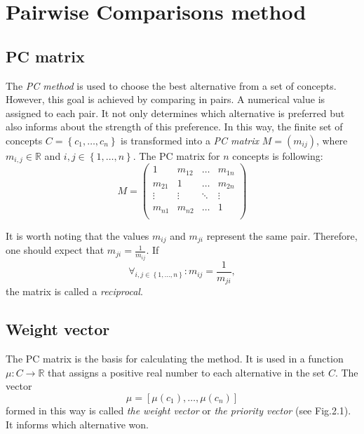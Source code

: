 \chapter{Pairwise Comparisons method}
\label{sec:pcMethod}
  \section{PC matrix}
	\label{subsec:macierzPC}
	
	The \textit{PC method} is used to choose the best alternative from a set of concepts. However, this goal is achieved by comparing in pairs. A numerical value is assigned to each pair. It not only determines which alternative is preferred but also informs about the strength of this preference. In this way, the finite set of concepts $C=\left\{ c_{1},\ldots,c_{n}\right\} $ is transformed into a \textit{PC matrix} $M=\left(m_{ij}\right)$, where $m_{i,j}\in \mathbb{R}$ and $i,j\in\left\{ 1,\ldots,n\right\}$. The PC matrix for $n$ concepts is following:
$$
M = 
\left(
\begin{array}{lllll}
	1 & m_{12} & \dots & m_{1n}\\
	m_{21} & 1 & \dots & m_{2n}\\
	\vdots & \vdots & \ddots & \vdots\\
	m_{n1} & m_{n2} & \dots & 1\\ 	
\end{array}
\right)
$$

	It is worth noting that the values $m_{ij}$ and $m_{ji}$ represent the same pair. Therefore, one should expect that $m_{ji}=\frac{1}{m_{ij}}$. If
	\begin{equation} 
		\forall _{i,j\in\left\{ 1,\ldots,n\right\}} :m_{ij}=\frac{1}{m_{ji}},
	\end{equation}
		the matrix is called a \textit{reciprocal}.

  \section{Weight vector}
	\label{subsec:wektorWag}
	
	The PC matrix is the basis for calculating the method. It is used in a function $\mu:C\rightarrow \mathbb{R}$ that assigns a positive real number to each alternative in the set $C$. The vector $$\mu=\left[\mu\left(c_{1}\right),\ldots,\mu\left(c_{n}\right)\right]$$ formed in this way is called \textit{the weight vector} or \textit{the priority vector} (see Fig.2.1). It informs which alternative won.

